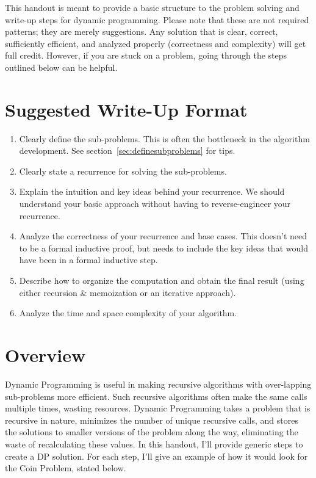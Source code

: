 \documentclass[11pt]{article}
\begin{document}
\noindent
{}

\bigskip
\medskip

This handout is meant to provide a basic structure to the problem solving and write-up steps for dynamic programming. Please note that these are not required patterns; they are merely suggestions. Any solution that is clear, correct, sufficiently efficient, and analyzed properly (correctness and complexity) will get full credit. However, if you are stuck on a problem, going through the steps outlined below can be helpful.

\section*{Suggested Write-Up Format}
\begin{enumerate}
    \item Clearly define the sub-problems. This is often the bottleneck in the algorithm development. See section~\ref{sec:definesubproblems} for tips.
    \item Clearly state a recurrence for solving the sub-problems.
    \item Explain the intuition and key ideas behind your recurrence. We should understand your basic approach without having to reverse-engineer your recurrence.
    \item Analyze the correctness of your recurrence and base cases. This doesn't need to be a formal inductive proof, but needs to include the key ideas that would have been in a formal inductive step.
    \item Describe how to organize the computation and obtain the final result (using either recursion \& memoization or an iterative approach).
    \item Analyze the time and space complexity of your algorithm.
\end{enumerate}

\section*{Overview}
Dynamic Programming is useful in making recursive algorithms with over-lapping sub-problems more efficient. Such recursive algorithms often make the same calls multiple times, wasting resources. Dynamic Programming takes a problem that is recursive in nature, minimizes the number of unique recursive calls, and stores the solutions to smaller versions of the problem along the way, eliminating the waste of recalculating these values. In this handout, I'll provide generic steps to create a DP solution. For each step, I'll give an example of how it would look for the Coin Problem, stated below.
\end{document}
